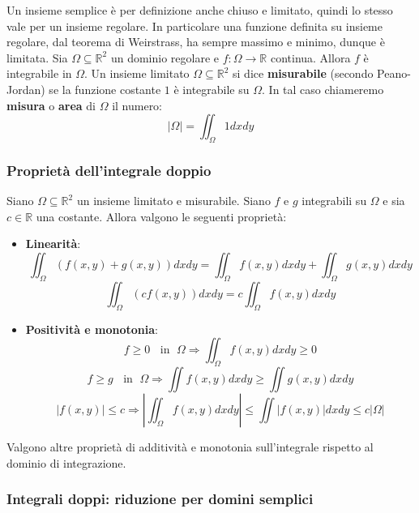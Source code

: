 \documentclass[a4paper]{article}
\numberwithin{equation}{subsection}
\begin{document}
\noindent
Un insieme semplice è per definizione anche chiuso e limitato, quindi lo stesso vale per un insieme regolare.
In particolare una funzione definita su insieme regolare, dal teorema di Weirstrass, ha sempre massimo e minimo, dunque è limitata.
\thm{}
{
    Sia $\Omega \subseteq \mathbb{R}^2$ un dominio regolare e $f : \Omega \rightarrow \mathbb{R}$ continua.
    Allora $f$ è integrabile in $\Omega$.
}
{
    Un insieme limitato $\Omega \subseteq \mathbb{R}^2$ si dice \textbf{misurabile} (secondo Peano-Jordan) 
    se la funzione costante $1$ è integrabile su $\Omega$.
    In tal caso chiameremo \textbf{misura} o \textbf{area} di $\Omega$ il numero:
    \[|\Omega| = \iint_\Omega 1 dxdy\]
}

\subsubsection{Proprietà dell'integrale doppio}

Siano $\Omega \subseteq \mathbb{R}^2$ un insieme limitato e misurabile. Siano $f$ e $g$ integrabili su $\Omega$ e sia $c \in \mathbb{R}$ una costante.
Allora valgono le seguenti proprietà:

\begin{itemize}
    \item \textbf{Linearità}:
    \[\iint_\Omega (f(x,y) + g(x,y)) dxdy = \iint_\Omega f(x,y) dxdy + \iint_\Omega g(x,y) dxdy\]
    \[\iint_\Omega (cf(x,y)) dxdy = c\iint_\Omega f(x,y) dxdy\]
    \item \textbf{Positività e monotonia}:
    \[f \ge 0 \; \; \text{ in } \; \Omega \Longrightarrow \iint_\Omega f(x,y)dxdy \ge 0\]
    \[f \ge g \; \; \text{ in } \; \Omega \Longrightarrow \iint f(x,y)dxdy \ge \iint g(x,y) dxdy\]
    \[|f(x,y)| \le c \Longrightarrow \left|\iint_{\Omega} f(x,y)dxdy\right| \le \iint |f(x,y)|dxdy \le c|\Omega|\]
\end{itemize}
\noindent
Valgono altre proprietà di additività e monotonia sull'integrale rispetto al dominio di integrazione.

\subsubsection{Integrali doppi: riduzione per domini semplici}
\end{document}
